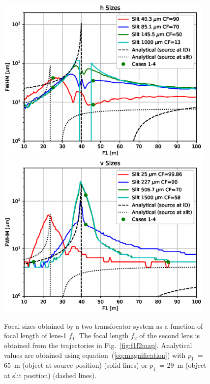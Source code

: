 \documentclass{iucr}              %
\begin{document}
\begin{figure}
    \centering
    
    \includegraphics[width=0.95\textwidth]{figures/sizes_h.eps}
    \includegraphics[width=0.95\textwidth]{figures/sizes_v.eps}
        
    \caption{Focal sizes obtained by a two transfocator system as a function of focal length of lens-1 $f_1$. The focal length $f_2$ of the second lens is obtained from the trajectories in Fig.~\ref{fig:f1f2map}. 
    Analytical values are obtained using equation~(\ref{eq:magnification}) with $p_1$~= \SI{65}{\meter} (object at source position) (solid lines) or $p_1$~= \SI{29}{\meter} (object at slit position) (dashed lines). 
    }
    \label{fig:focalSizes}
\end{figure}
\end{document}
